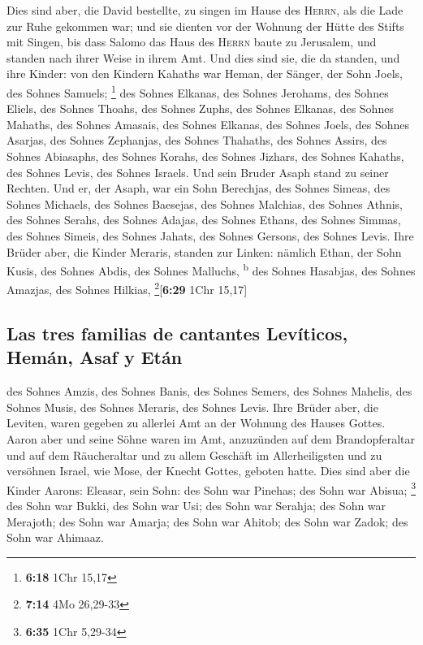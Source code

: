  Dies sind aber, die David bestellte, zu singen im Hause
des \textsc{Herrn}, als die Lade zur Ruhe gekommen war; 
und sie dienten vor der Wohnung der Hütte des Stifts mit Singen, bis
dass Salomo das Haus des \textsc{Herrn} baute zu Jerusalem, und standen
nach ihrer Weise in ihrem Amt.  Und dies sind sie, die da
standen, und ihre Kinder: von den Kindern Kahaths war Heman, der Sänger,
der Sohn Joels, des Sohnes Samuels; \footnote{\textbf{6:18} 1Chr 15,17}
 des Sohnes Elkanas, des Sohnes Jerohams, des Sohnes
Eliels, des Sohnes Thoahs,  des Sohnes Zuphs, des Sohnes
Elkanas, des Sohnes Mahaths, des Sohnes Amasais,  des
Sohnes Elkanas, des Sohnes Joels, des Sohnes Asarjas, des Sohnes
Zephanjas,  des Sohnes Thahaths, des Sohnes Assirs, des
Sohnes Abiasaphs, des Sohnes Korahs,  des Sohnes Jizhars,
des Sohnes Kahaths, des Sohnes Levis, des Sohnes Israels.
 Und sein Bruder Asaph stand zu seiner Rechten. Und er,
der Asaph, war ein Sohn Berechjas, des Sohnes Simeas, 
des Sohnes Michaels, des Sohnes Baesejas, des Sohnes Malchias,
 des Sohnes Athnis, des Sohnes Serahs, des Sohnes Adajas,
 des Sohnes Ethans, des Sohnes Simmas, des Sohnes Simeis,
 des Sohnes Jahats, des Sohnes Gersons, des Sohnes Levis.
 Ihre Brüder aber, die Kinder Meraris, standen zur
Linken: nämlich Ethan, der Sohn Kusis, des Sohnes Abdis, des Sohnes
Malluchs, \textsuperscript{b}  des Sohnes Hasabjas, des
Sohnes Amazjas, des Sohnes Hilkias, \footnote{\textbf{7:14} 4Mo 26,29-33}{[}\textbf{6:29}
1Chr 15,17{]}

\hypertarget{las-tres-familias-de-cantantes-levuxedticos-hemuxe1n-asaf-y-etuxe1n}{%
\subsection{Las tres familias de cantantes Levíticos, Hemán, Asaf y
Etán}\label{las-tres-familias-de-cantantes-levuxedticos-hemuxe1n-asaf-y-etuxe1n}}

 des Sohnes Amzis, des Sohnes Banis, des Sohnes Semers,
 des Sohnes Mahelis, des Sohnes Musis, des Sohnes
Meraris, des Sohnes Levis.  Ihre Brüder aber, die
Leviten, waren gegeben zu allerlei Amt an der Wohnung des Hauses Gottes.
 Aaron aber und seine Söhne waren im Amt, anzuzünden auf
dem Brandopferaltar und auf dem Räucheraltar und zu allem Geschäft im
Allerheiligsten und zu versöhnen Israel, wie Mose, der Knecht Gottes,
geboten hatte.  Dies sind aber die Kinder Aarons:
Eleasar, sein Sohn: des Sohn war Pinehas; des Sohn war Abisua;
\footnote{\textbf{6:35} 1Chr 5,29-34}  des Sohn war
Bukki, des Sohn war Usi; des Sohn war Serahja;  des Sohn
war Merajoth; des Sohn war Amarja; des Sohn war Ahitob; 
des Sohn war Zadok; des Sohn war Ahimaaz.

